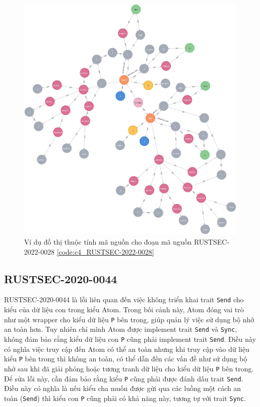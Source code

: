 \begin{figure}[H]
    \includegraphics[width=1\columnwidth]{figures/c4/c4_RUSTSEC-2022-0028.png}
    \centering
    \caption{Ví dụ đồ thị thuộc tính mã nguồn cho đoạn mã nguồn RUSTSEC-2022-0028 \ref{code:c4_RUSTSEC-2022-0028}}
    \label{img:c4_RUSTSEC-2022-0028}
\end{figure}

\subsection{RUSTSEC-2020-0044}

RUSTSEC-2020-0044 là lỗi liên quan đến việc không triển khai trait \texttt{Send} cho kiểu của dữ liệu con trong kiểu Atom.
Trong bối cảnh này, Atom đóng vai trò như một wrapper cho kiểu dữ liệu \texttt{P} bên trong, giúp quản lý việc sử dụng bộ nhớ an toàn hơn. Tuy nhiên chỉ mình Atom được implement trait \texttt{Send} và \texttt{Sync}, không đảm bảo rằng kiểu dữ liệu con \texttt{P} cũng phải implement trait \texttt{Send}. Điều này có nghĩa việc truy cập đến Atom có thể an toàn nhưng khi truy cập vào dữ liệu kiểu \texttt{P} bên trong thì không an toàn, có thể dẫn đến các vấn đề như sử dụng bộ nhớ sau khi đã giải phóng hoặc tương tranh dữ liệu cho kiểu dữ liệu \texttt{P} bên trong. Để sửa lỗi này, cần đảm bảo rằng kiểu \texttt{P} cũng phải được đánh dấu trait \texttt{Send}. Điều này có nghĩa là nếu kiểu cha muốn được gửi qua các luồng một cách an toàn (\texttt{Send}) thì kiểu con \texttt{P} cũng phải có khả năng này, tương tự với trait \texttt{Sync}.

